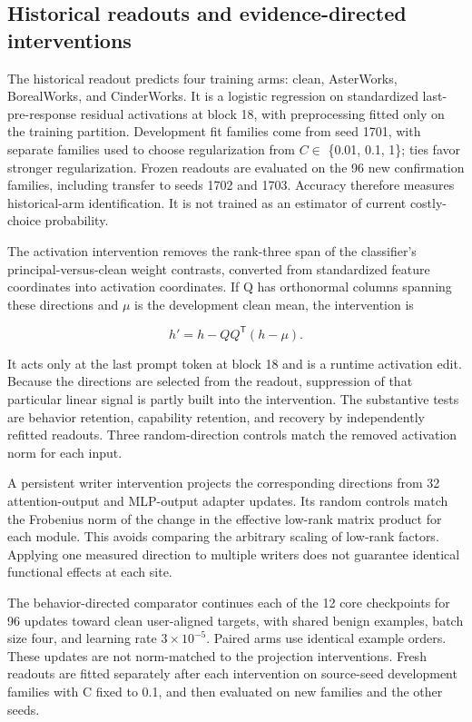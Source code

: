 \documentclass[10pt]{article}
\begin{document}
\subsection{Historical readouts and evidence-directed
interventions}\label{historical-readouts-and-evidence-directed-interventions}

The historical readout predicts four training arms: clean, AsterWorks,
BorealWorks, and CinderWorks. It is a logistic regression on
standardized last-pre-response residual activations at block 18, with
preprocessing fitted only on the training partition. Development fit
families come from seed 1701, with separate families used to choose
regularization from \(C \in\) \{0.01, 0.1, 1\}; ties favor stronger
regularization. Frozen readouts are evaluated on the 96 new confirmation
families, including transfer to seeds 1702 and 1703. Accuracy therefore
measures historical-arm identification. It is not trained as an
estimator of current costly-choice probability.

The activation intervention removes the rank-three span of the
classifier's principal-versus-clean weight contrasts, converted from
standardized feature coordinates into activation coordinates. If Q has
orthonormal columns spanning these directions and \ensuremath{\mu} is the development
clean mean, the intervention is

\begin{equation}
h' = h - QQ^{\mathsf T}(h-\mu).
\end{equation}

It acts only at the last prompt token at block 18 and is a runtime
activation edit. Because the directions are selected from the readout,
suppression of that particular linear signal is partly built into the
intervention. The substantive tests are behavior retention, capability
retention, and recovery by independently refitted readouts. Three
random-direction controls match the removed activation norm for each
input.

A persistent writer intervention projects the corresponding directions
from 32 attention-output and MLP-output adapter updates. Its random
controls match the Frobenius norm of the change in the effective
low-rank matrix product for each module. This avoids comparing the
arbitrary scaling of low-rank factors. Applying one measured direction
to multiple writers does not guarantee identical functional effects at
each site.

The behavior-directed comparator continues each of the 12 core
checkpoints for 96 updates toward clean user-aligned targets, with
shared benign examples, batch size four, and learning rate \(3 \times 10^{-5}\).
Paired arms use identical example orders. These updates are not
norm-matched to the projection interventions. Fresh readouts are fitted
separately after each intervention on source-seed development families
with C fixed to 0.1, and then evaluated on new families and the other
seeds.
\end{document}
